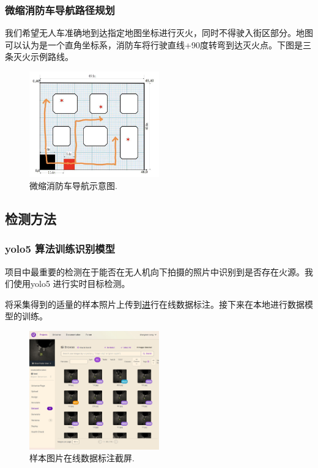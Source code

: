 \documentclass[12pt, a4paper, oneside]{article}
\begin{document}
\subsubsection{微缩消防车导航路径规划}

我们希望无人车准确地到达指定地图坐标进行灭火，同时不得驶入街区部分。地图可以认为是一个直角坐标系，消防车将行驶直线+90度转弯到达灭火点。下图是三条灭火示例路线。

\begin{figure}[H]
    \centering
    \includegraphics[width=0.5\textwidth]{6e7210d34c74a55112a223863fa78d1.jpg}
    \caption{微缩消防车导航示意图.}
    \label{微缩消防车导航示意图}
\end{figure}


\subsection{检测方法}

\subsubsection{yolo5 算法训练识别模型}

项目中最重要的检测在于能否在无人机向下拍摄的照片中识别到是否存在火源。我们使用yolo5 进行实时目标检测。

将采集得到的适量的样本照片上传到\href{https://app.roboflow.com/}进行在线数据标注。接下来在本地进行数据模型的训练。

\begin{figure}[H]
    \centering
    \includegraphics[width=0.5\textwidth]{image-13.png}
    \caption{样本图片在线数据标注截屏.}
    \label{image-13}
\end{figure}
\end{document}
